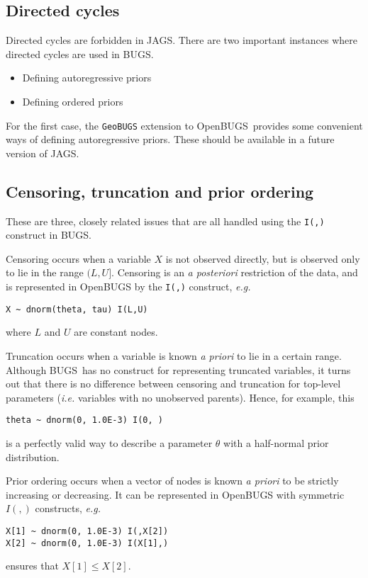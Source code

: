 \documentclass[11pt, a4paper, titlepage]{report}
\newcommand{\JAGS}{\textsf{JAGS}}
\newcommand{\BUGS}{\textsf{BUGS}}
\newcommand{\OpenBUGS}{\textsf{OpenBUGS}}
\begin{document}
\subsection{Directed cycles}

Directed cycles are forbidden in \JAGS. There are two important
instances where directed cycles are used in \BUGS.
\begin{itemize}
\item Defining autoregressive priors
\item Defining ordered priors
\end{itemize}
For the first case, the \texttt{GeoBUGS} extension to \OpenBUGS\ provides
some convenient ways of defining autoregressive priors. These should be
available in a future version of \JAGS.

\subsection{Censoring, truncation and prior ordering}
\label{section:censoring}

These are three, closely related issues that are all handled using
the \texttt{I(,)} construct in \BUGS.

Censoring occurs when a variable $X$ is not observed directly,
but is observed only to lie in the range $(L,U]$.  Censoring is
an {\em a posteriori} restriction of the data, and is represented
in OpenBUGS by the \texttt{I(,)} construct, {\em e.g.}
\begin{verbatim}
X ~ dnorm(theta, tau) I(L,U)
\end{verbatim}
where $L$ and $U$ are constant nodes.

Truncation occurs when a variable is known {\em a priori} to lie in
a certain range.  Although \BUGS\ has no construct for representing
truncated variables, it turns out that there is no difference between
censoring and truncation for top-level parameters ({\em i.e.} variables
with no unobserved parents).  Hence, for example, this
\begin{verbatim}
theta ~ dnorm(0, 1.0E-3) I(0, )
\end{verbatim}
is a perfectly valid way to describe a parameter $\theta$ with a
half-normal prior distribution.

Prior ordering occurs when a vector of nodes is known {\em a priori}
to be strictly increasing or decreasing. It can be represented in
OpenBUGS with symmetric $I(,)$ constructs,  {\em e.g.}
\begin{verbatim}
X[1] ~ dnorm(0, 1.0E-3) I(,X[2])
X[2] ~ dnorm(0, 1.0E-3) I(X[1],)
\end{verbatim}
ensures that $X[1] \leq X[2]$.
\end{document}
